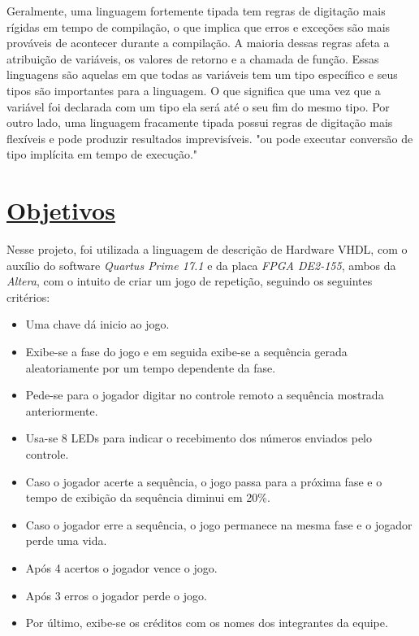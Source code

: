 \documentclass[14pt, oneside]{book}
\newcommand\tab[1][1cm]{\hspace*{#1}}
\theoremstyle{definition}
\begin{document}
	        \tab Geralmente, uma linguagem fortemente tipada tem regras de digitação mais rígidas em tempo de compilação, o que implica que erros e exceções são mais prováveis de acontecer durante a compilação. A maioria dessas regras afeta a atribuição de variáveis, os valores de retorno e a chamada de função. Essas linguagens são aquelas em que todas as variáveis tem um tipo específico e seus tipos são importantes para a linguagem. O que significa que uma vez que a variável foi declarada com um tipo ela será até o seu fim do mesmo tipo. Por outro lado, uma linguagem fracamente tipada possui regras de digitação mais flexíveis e pode produzir resultados imprevisíveis. "ou pode executar conversão de tipo implícita em tempo de execução."
	        
           
            
        \chapter[Objetivos]{\hypertarget{obj}{}\hyperlink{toc}{Objetivos}}
             \tab Nesse projeto, foi utilizada a linguagem de descrição de Hardware VHDL, com o auxílio do software \textit{Quartus Prime 17.1} e da placa \textit{FPGA DE2-155}, ambos da \textit{Altera}, com o intuito de criar um jogo de repetição, seguindo os seguintes critérios:
            \begin{itemize}
                \item Uma chave dá inicio ao jogo.
                \item Exibe-se a fase do jogo e em seguida exibe-se a sequência gerada aleatoriamente por um tempo dependente da fase.
                \item Pede-se para o jogador digitar no controle remoto a sequência mostrada anteriormente.
                \item Usa-se 8 LEDs para indicar o recebimento dos números enviados pelo controle.
                \item Caso o jogador acerte a sequência, o jogo passa para a próxima fase e o tempo de exibição da sequência diminui em 20\%.
                \item Caso o jogador erre a sequência, o jogo permanece na mesma fase e o jogador perde uma vida.
                \item Após 4 acertos o jogador vence o jogo.
                \item Após 3 erros o jogador perde o jogo.
                \item Por último, exibe-se os créditos com os nomes dos integrantes da equipe.
            \end{itemize}
            
\end{document}
